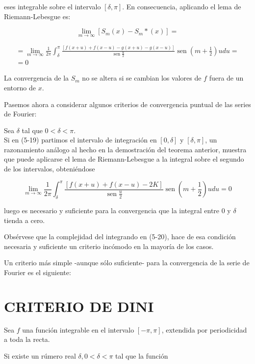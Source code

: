 \documentclass[10pt]{article}
\theoremstyle{plain}
\theoremstyle{definition}
\theoremstyle{remark}
\begin{document}
eses integrable sobre el intervalo $[\delta, \pi]$. En consecuencia, aplicando el lema de Riemann-Lebesgue es:

$$
\lim _{m \rightarrow \infty}\left[S_{m}(x)-S_{m} *(x)\right]=
$$

$$
\begin{gathered}
=\lim _{m \rightarrow \infty} \frac{1}{2 \pi} \int_{\delta}^{\pi} \frac{[f(x+u)+f(x-u)-g(x+u)-g(x-u)]}{\operatorname{sen} \frac{u}{2}} \operatorname{sen}\left(m+\frac{1}{2}\right) u d u= \\
=0
\end{gathered}
$$

La convergencia de la $S_{m}$ no se altera si se cambian los valores de $f$ fuera de un entorno de $x$.

Pasemos ahora a considerar algunos criterios de convergencia puntual de las series de Fourier:

Sea $\delta$ tal que $0<\delta<\pi$.\\
Si en (5-19) partimos el intervalo de integración en $[0, \delta]$ y $[\delta, \pi]$, un razonamiento análogo al hecho en la demostración del teorema anterior, muestra que puede aplicarse el lema de Riemann-Lebesgue a la integral sobre el segundo de los intervalos, obteniéndose


\begin{equation*}
\lim _{m \rightarrow \infty} \frac{1}{2 \pi} \int_{\delta}^{\pi} \frac{[f(x+u)+f(x-u)-2 K]}{\operatorname{sen} \frac{u}{2}} \operatorname{sen}\left(m+\frac{1}{2}\right) u d u=0 \tag{5-20}
\end{equation*}


luego es necesario y suficiente para la convergencia que la integral entre 0 y $\delta$ tienda a cero.

Obsérvese que la complejidad del integrando en (5-20), hace de esa condición necesaria y suficiente un criterio incómodo en la mayoría de los casos.

Un criterio más simple -aunque sólo suficiente- para la convergencia de la serie de Fourier es el siguiente:

\section*{CRITERIO DE DINI}
Sea $f$ una función integrable en el intervalo $[-\pi, \pi]$, extendida por periodicidad a toda la recta.

Si existe un rúmero real $\delta, 0<\delta<\pi$ tal que la función
\end{document}
